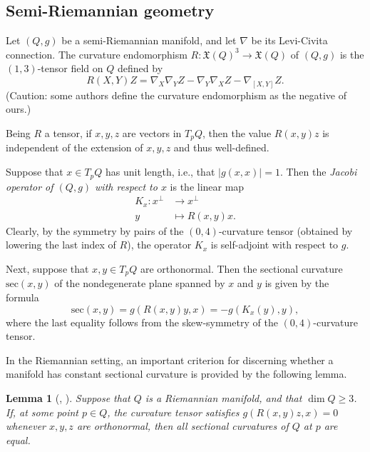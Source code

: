 \documentclass[a4paper,12pt,oneside]{amsart}
\theoremstyle{plain}
\newtheorem{lemma}[theorem]{Lemma}
\theoremstyle{remark}
\theoremstyle{definition}
\begin{document}
\subsection{Semi-Riemannian geometry}
Let $(Q,g)$ be a semi-Riemannian manifold, and let $\nabla$ be its Levi-Civita connection. The curvature endomorphism $R \colon \mathfrak{X}(Q)^{3} \to \mathfrak{X}(Q)$ of $(Q,g)$ is the $(1,3)$-tensor field on $Q$ defined by
\begin{equation*}
	R(X,Y)Z= \nabla_{X}\nabla_{Y}Z-\nabla_{Y}\nabla_{X}Z-\nabla_{[X,Y]}Z.
\end{equation*}
(Caution: some authors define the curvature endomorphism as the negative of ours.)

Being $R$ a tensor, if $x,y,z$ are vectors in $T_{p}Q$, then the value $R(x,y)z$ is independent of the extension of $x,y,z$ and thus well-defined. 

Suppose that $x \in T_{p}Q$ has unit length, i.e., that $\lvert g(x,x) \rvert =1$. Then the \textit{Jacobi operator of $(Q,g)$ with respect to $x$} is the linear map
\begin{align*}
	K_{x} \colon x^{\perp} &\to x^{\perp}\\
	y &\mapsto R(x,y)x.
\end{align*}
Clearly, by the symmetry by pairs of the $(0,4)$-curvature tensor (obtained by lowering the last index of $R$), the operator $K_{x}$ is self-adjoint with respect to $g$.%

Next, suppose that $x,y \in T_{p}Q$ are orthonormal. Then the sectional curvature $\mathrm{sec}(x,y)$ of the nondegenerate plane spanned by $x$ and $y$ is given by the formula
\begin{equation*}
	\mathrm{sec}(x,y)= g(R(x,y)y,x)=-g(K_{x}(y),y),
\end{equation*}
where the last equality follows from the skew-symmetry of the $(0,4)$-curvature tensor.

In the Riemannian setting, an important criterion for discerning whether a manifold has constant sectional curvature is provided by the following lemma.

\begin{lemma}[{\cite{cartan1946}, \cite[Lemma~1.17]{dajczer2019}}] \label{RiemLM}
	Suppose that $Q$ is a Riemannian manifold, and that $\dim Q \geq 3$. If, at some point $p \in Q$, the curvature tensor satisfies $g(R(x,y)z, x)=0$ whenever $x,y,z$ are orthonormal, then all sectional curvatures of $Q$ at $p$ are equal.
\end{lemma}
\end{document}
